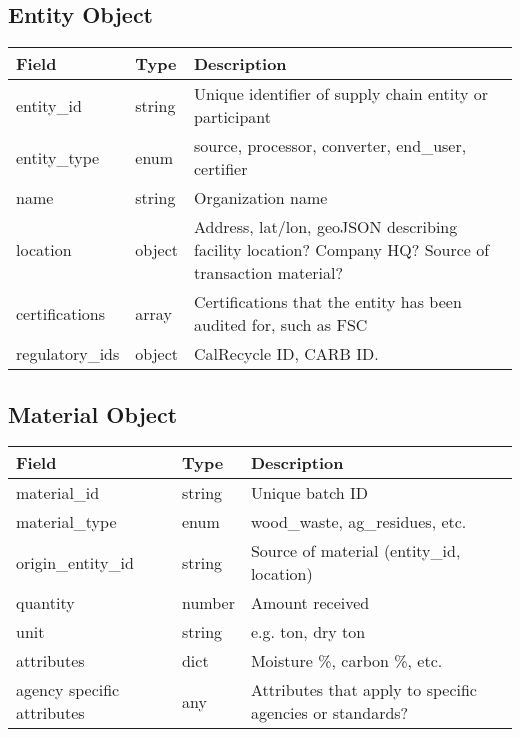 \documentclass{article}
\begin{document}
\subsection*{Entity Object}
\begin{longtable}{|p{3cm}|p{3cm}|p{8cm}|}
\hline
\textbf{Field} & \textbf{Type} & \textbf{Description} \\
\hline
entity\_id & string & Unique identifier of supply chain entity or participant\\
entity\_type & enum & source, processor, converter, end\_user, certifier \\
name & string & Organization name \\
location & object & Address, lat/lon, geoJSON describing facility location? Company HQ? Source of transaction material? \\
certifications & array & Certifications that the entity has been audited for, such as FSC \\
regulatory\_ids & object & CalRecycle ID, CARB ID.  \\
\hline
\end{longtable}

\subsection*{Material Object}
\begin{longtable}{|p{3cm}|p{3cm}|p{8cm}|}
\hline
\textbf{Field} & \textbf{Type} & \textbf{Description} \\
\hline
material\_id & string & Unique batch ID \\
material\_type & enum & wood\_waste, ag\_residues, etc. \\
origin\_entity\_id & string & Source of material (entity\_id, location) \\
quantity & number & Amount received \\
unit & string & e.g. ton, dry ton \\
attributes & dict & Moisture \%, carbon \%, etc. \\
agency specific attributes & any & Attributes that apply to specific agencies or standards? \\
\hline
\end{longtable}
\end{document}
